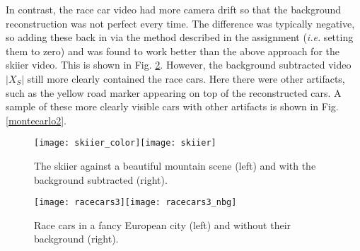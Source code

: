 \documentclass{article}
\begin{document}
In contrast, the race car video had more camera drift so that the background reconstruction was not perfect every time. The difference was typically negative, so adding these back in via the method described in the assignment (\textit{i.e.} setting them to zero) and was found to work better than the above approach for the skiier video. This is shown in Fig. \ref{montecarlo}. However, the background subtracted video $|X_S|$ still more clearly contained the race cars. Here there were other artifacts, such as the yellow road marker appearing on top of the reconstructed cars. A sample of these more clearly visible cars with other artifacts is shown in Fig. \ref{montecarlo2}.

\begin{figure}[hb!]
  \centering
  \texttt{[image: skiier\_color]}\quad\quad\quad\texttt{[image: skiier]}
  \caption{The skiier against a beautiful mountain scene (left) and with the background subtracted (right).}\label{skiiers}
\end{figure}

\begin{figure}[ht!]
  \centering
  \texttt{[image: racecars3]}\quad\quad\quad\texttt{[image: racecars3\_nbg]}
  \caption{Race cars in a fancy European city (left) and without their background (right).}\label{montecarlo}
\end{figure}


\end{document}
